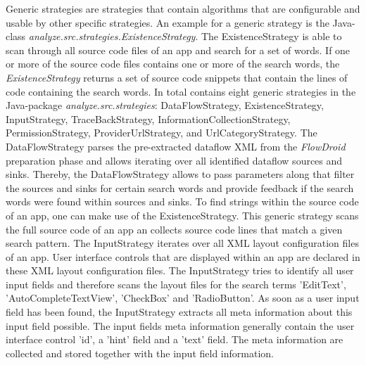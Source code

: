 Generic strategies are strategies that contain algorithms that are configurable and usable by other specific strategies.
An example for a generic strategy is the Java-class \textit{analyze.src.strategies.ExistenceStrategy}. 
The ExistenceStrategy is able to scan through all source code files of an app and search for a set of words.
If one or more of the source code files contains one or more of the search words, the \textit{ExistenceStrategy} returns a set of source code snippets that contain the lines of code containing the search words.
In total \AIPRAT contains eight generic strategies in the Java-package \textit{analyze.src.strategies}: DataFlowStrategy, ExistenceStrategy, InputStrategy, TraceBackStrategy, InformationCollectionStrategy, PermissionStrategy, ProviderUrlStrategy, and UrlCategoryStrategy.
The DataFlowStrategy parses the pre-extracted dataflow \acs{XML} from the \textit{FlowDroid} preparation phase and allows iterating over all identified dataflow sources and sinks.
Thereby, the DataFlowStrategy allows to pass parameters along that filter the sources and sinks for certain search words and provide feedback if the search words were found within sources and sinks.
To find strings within the source code of an app, one can make use of the ExistenceStrategy. 
This generic strategy scans the full source code of an app an collects source code lines that match a given search pattern.
The InputStrategy iterates over all \acs{XML} layout configuration files of an app. 
User interface controls that are displayed within an app are declared in these \acs{XML} layout configuration files.
The InputStrategy tries to identify all user input fields and therefore scans the layout files for the search terms 'EditText', 'AutoCompleteTextView', 'CheckBox' and 'RadioButton'.
As soon as a user input field has been found, the InputStrategy extracts all meta information about this input field possible.
The input fields meta information generally contain the user interface control 'id', a 'hint' field and a 'text' field. 
The meta information are collected and stored together with the input field information.

